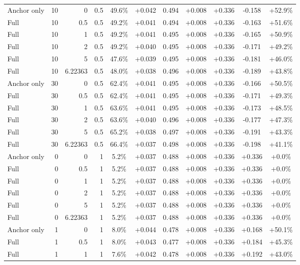 \begin{table}[htbp]
\begin{tabular}{lrrrccccccc}
Anchor only & 10 & 0 & 0.5 & 49.6\% & +0.042 & 0.494 & +0.008 & +0.336 & -0.158 & +52.9\% \\
Full & 10 & 0.5 & 0.5 & 49.2\% & +0.041 & 0.494 & +0.008 & +0.336 & -0.163 & +51.6\% \\
Full & 10 & 1 & 0.5 & 49.2\% & +0.041 & 0.495 & +0.008 & +0.336 & -0.165 & +50.9\% \\
Full & 10 & 2 & 0.5 & 49.2\% & +0.040 & 0.495 & +0.008 & +0.336 & -0.171 & +49.2\% \\
Full & 10 & 5 & 0.5 & 47.6\% & +0.039 & 0.495 & +0.008 & +0.336 & -0.181 & +46.0\% \\
Full & 10 & 6.22363 & 0.5 & 48.0\% & +0.038 & 0.496 & +0.008 & +0.336 & -0.189 & +43.8\% \\
Anchor only & 30 & 0 & 0.5 & 62.4\% & +0.041 & 0.495 & +0.008 & +0.336 & -0.166 & +50.5\% \\
Full & 30 & 0.5 & 0.5 & 62.4\% & +0.041 & 0.495 & +0.008 & +0.336 & -0.171 & +49.3\% \\
Full & 30 & 1 & 0.5 & 63.6\% & +0.041 & 0.495 & +0.008 & +0.336 & -0.173 & +48.5\% \\
Full & 30 & 2 & 0.5 & 63.6\% & +0.040 & 0.496 & +0.008 & +0.336 & -0.177 & +47.3\% \\
Full & 30 & 5 & 0.5 & 65.2\% & +0.038 & 0.497 & +0.008 & +0.336 & -0.191 & +43.3\% \\
Full & 30 & 6.22363 & 0.5 & 66.4\% & +0.037 & 0.498 & +0.008 & +0.336 & -0.198 & +41.1\% \\
Anchor only & 0 & 0 & 1 & 5.2\% & +0.037 & 0.488 & +0.008 & +0.336 & +0.336 & +0.0\% \\
Full & 0 & 0.5 & 1 & 5.2\% & +0.037 & 0.488 & +0.008 & +0.336 & +0.336 & +0.0\% \\
Full & 0 & 1 & 1 & 5.2\% & +0.037 & 0.488 & +0.008 & +0.336 & +0.336 & +0.0\% \\
Full & 0 & 2 & 1 & 5.2\% & +0.037 & 0.488 & +0.008 & +0.336 & +0.336 & +0.0\% \\
Full & 0 & 5 & 1 & 5.2\% & +0.037 & 0.488 & +0.008 & +0.336 & +0.336 & +0.0\% \\
Full & 0 & 6.22363 & 1 & 5.2\% & +0.037 & 0.488 & +0.008 & +0.336 & +0.336 & +0.0\% \\
Anchor only & 1 & 0 & 1 & 8.0\% & +0.044 & 0.478 & +0.008 & +0.336 & +0.168 & +50.1\% \\
Full & 1 & 0.5 & 1 & 8.0\% & +0.043 & 0.477 & +0.008 & +0.336 & +0.184 & +45.3\% \\
Full & 1 & 1 & 1 & 7.6\% & +0.042 & 0.478 & +0.008 & +0.336 & +0.192 & +43.0\% \\

\end{tabular}
\end{table}
